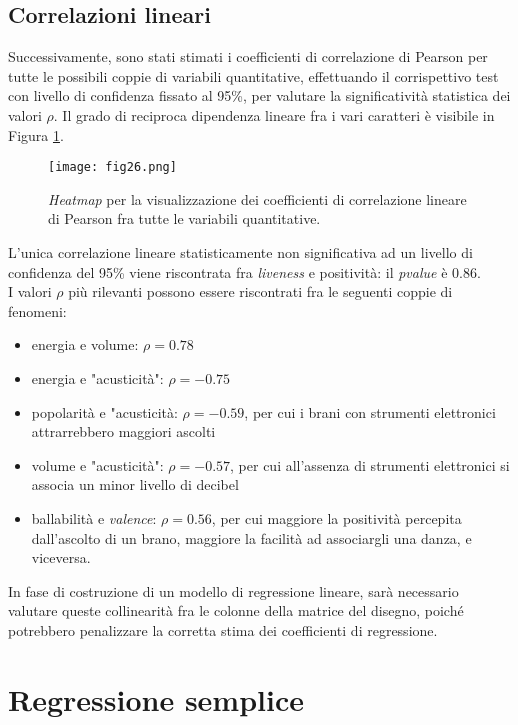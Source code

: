 \documentclass[fleqn,10pt]{SelfArx} %
\begin{document}
\subsection{Correlazioni lineari}
Successivamente, sono stati stimati i coefficienti di correlazione di Pearson per tutte le possibili coppie di variabili quantitative, effettuando il corrispettivo test con livello di confidenza fissato al 95\%, per valutare la significatività statistica dei valori $\rho$. Il grado di reciproca dipendenza lineare fra i vari caratteri è visibile in Figura \ref{fig:fig26}.
\begin{figure}[H]
    \centering
    \texttt{[image: fig26.png]}
    \label{fig:fig26}
    \caption{\textit{Heatmap} per la visualizzazione dei coefficienti di correlazione lineare di Pearson fra tutte le variabili quantitative.}
\end{figure}
L'unica correlazione lineare statisticamente non significativa ad un livello di confidenza del 95\% viene riscontrata fra \textit{liveness} e positività: il \textit{pvalue} è 0.86.\\
I valori $\rho$ più rilevanti possono essere riscontrati fra le seguenti coppie di fenomeni:
\begin{itemize}
    \item energia e volume: $\rho=0.78$ 
    \item energia e "acusticità": $\rho=-0.75$
    \item popolarità e "acusticità: $\rho=-0.59$, per cui i brani con strumenti elettronici attrarrebbero maggiori ascolti
    \item volume e "acusticità": $\rho=-0.57$, per cui all'assenza di strumenti elettronici si associa un minor livello di decibel
    \item ballabilità e \textit{valence}: $\rho=0.56$, per cui maggiore la positività percepita dall'ascolto di un brano, maggiore la facilità ad associargli una danza, e viceversa. 
\end{itemize}
In fase di costruzione di un modello di regressione lineare, sarà necessario valutare queste collinearità fra le colonne della matrice del disegno, poiché potrebbero penalizzare la corretta stima dei coefficienti di regressione.
\section{Regressione semplice}

\end{document}
